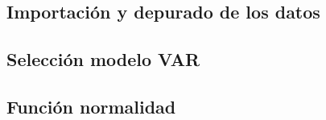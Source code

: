 \documentclass[12pt, twoside]{book}\usepackage[]{graphicx}\usepackage[]{color}
\numberwithin{equation}{section}
\numberwithin{theorem}{section}
\numberwithin{teorema}{section}
\numberwithin{defi}{section}
\numberwithin{prop}{section}
\numberwithin{defi}{section}
\theoremstyle{plain}
\begin{document}
\subsection{Importación y depurado de los datos}



\subsection{Selección modelo VAR}



\subsection{Función normalidad}



\endgroup
\end{document}
